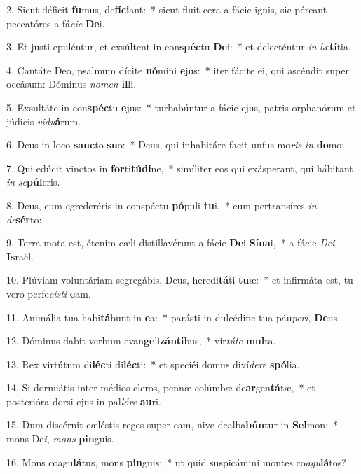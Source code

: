 2. Sicut déficit \textbf{fu}mus, de\textbf{fí}\textbf{ci}ant:~*  sicut fluit cera a fácie ignis, sic péreant peccatóres a fá\textit{ci}\textit{e} \textbf{De}i.\

3. Et justi epuléntur, et exsúltent in con\textbf{spéc}tu \textbf{De}i:~*  et delecténtur \textit{in} \textit{læ}\textbf{tí}tia.\

4. Cantáte Deo, psalmum dícite \textbf{nó}mini \textbf{e}jus:~*  iter fácite ei, qui ascéndit super occásum: Dóminus \textit{no}\textit{men} \textbf{il}li.\

5. Exsultáte in con\textbf{spéc}tu \textbf{e}jus:~*  turbabúntur a fácie ejus, patris orphanórum et júdicis \textit{vi}\textit{du}\textbf{á}rum.\

6. Deus in loco \textbf{sanc}to \textbf{su}o:~*  Deus, qui inhabitáre facit uníus mo\textit{ris} \textit{in} \textbf{do}mo:\

7. Qui edúcit vinctos in \textbf{for}ti\textbf{tú}\textbf{di}ne,~*  simíliter eos qui exásperant, qui hábitant \textit{in} \textit{se}\textbf{púl}cris.\

8. Deus, cum egrederéris in conspéctu \textbf{pó}puli \textbf{tu}i,~*  cum pertransíres \textit{in} \textit{de}\textbf{sér}to:\

9. Terra mota est, étenim cæli distillavérunt a fácie \textbf{De}i \textbf{Sí}\textbf{na}i,~*  a fácie \textit{De}\textit{i} \textbf{Is}raël.\

10. Plúviam voluntáriam segregábis, Deus, heredi\textbf{tá}ti \textbf{tu}æ:~*  et infirmáta est, tu vero perfe\textit{cís}\textit{ti} \textbf{e}am.\

11. Animália tua habi\textbf{tá}bunt in \textbf{e}a:~*  parásti in dulcédine tua páu\textit{pe}\textit{ri}, \textbf{De}us.\

12. Dóminus dabit verbum evan\textbf{ge}li\textbf{zán}\textbf{ti}bus,~*  vir\textit{tú}\textit{te} \textbf{mul}ta.\

13. Rex virtútum di\textbf{léc}ti di\textbf{léc}ti:~*  et speciéi domus diví\textit{de}\textit{re} \textbf{spó}lia.\

14. Si dormiátis inter médios cleros, pennæ colúmbæ de\textbf{ar}gen\textbf{tá}tæ,~*  et posterióra dorsi ejus in pal\textit{ló}\textit{re} \textbf{au}ri.\

15. Dum discérnit cæléstis reges super eam, nive dealba\textbf{bún}tur in \textbf{Sel}mon:~*  mons De\textit{i}, \textit{mons} \textbf{pin}guis.\

16. Mons coagu\textbf{lá}tus, mons \textbf{pin}guis:~*  ut quid suspicámini montes co\textit{a}\textit{gu}\textbf{lá}tos?\


